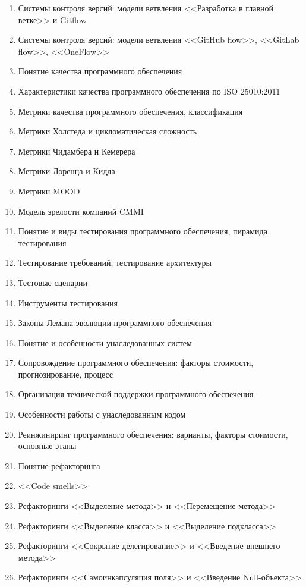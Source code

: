 \documentclass[a5paper]{article}
\begin{document}
\begin{enumerate}
    \item Системы контроля версий: модели ветвления <<Разработка в главной ветке>> и Gitflow
    \item Системы контроля версий: модели ветвления <<GitHub flow>>, <<GitLab flow>>, <<OneFlow>>
    \item Понятие качества программного обеспечения
    \item Характеристики качества программного обеспечения по ISO 25010:2011
    \item Метрики качества программного обеспечения, классификация
    \item Метрики Холстеда и цикломатическая сложность
    \item Метрики Чидамбера и Кемерера
    \item Метрики Лоренца и Кидда
    \item Метрики MOOD
    \item Модель зрелости компаний CMMI
    \item Понятие и виды тестирования программного обеспечения, пирамида тестирования
    \item Тестирование требований, тестирование архитектуры
    \item Тестовые сценарии
    \item Инструменты тестирования
    \item Законы Лемана эволюции программного обеспечения
    \item Понятие и особенности унаследованных систем
    \item Сопровождение программного обеспечения: факторы стоимости, прогнозирование, процесс
    \item Организация технической поддержки программного обеспечения
    \item Особенности работы с унаследованным кодом
    \item Реинжиниринг программного обеспечения: варианты, факторы стоимости, основные этапы
    \item Понятие рефакторинга
    \item <<Code smells>>
    \item Рефакторинги <<Выделение метода>> и <<Перемещение метода>>
    \item Рефакторинги <<Выделение класса>> и <<Выделение подкласса>>
    \item Рефакторинги <<Сокрытие делегирование>> и <<Введение внешнего метода>>
    \item Рефакторинги <<Самоинкапсуляция поля>> и <<Введение Null-объекта>>

\end{enumerate}
\end{document}
